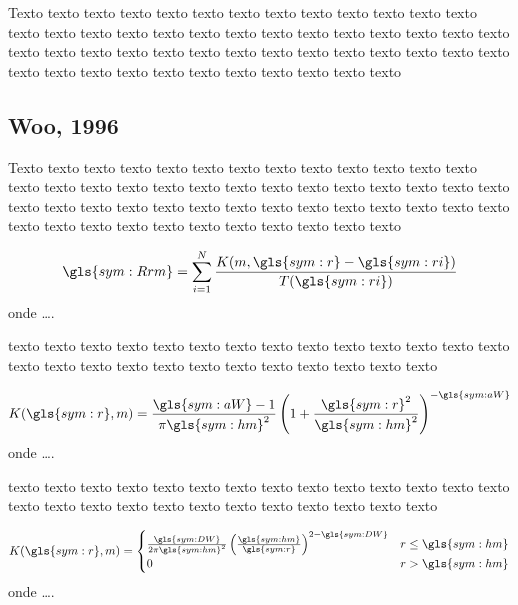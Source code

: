 Texto texto texto texto texto texto texto texto texto texto texto texto texto
texto texto texto texto texto texto texto texto texto texto texto texto texto
texto texto texto texto texto texto texto texto texto texto texto texto texto
texto texto texto texto texto texto texto texto texto texto texto texto texto



\subsection{Woo, 1996}
\label{sec:acidos_nucleicos}

Texto texto texto texto texto texto texto texto texto texto texto texto texto
texto texto texto texto texto texto texto texto texto texto texto texto texto
texto texto texto texto texto texto texto texto texto texto texto texto texto
texto texto texto texto texto texto texto texto texto texto texto texto texto




\begin{equation}
	\ensuremath{
		\gls{sym:Rrm} = \sum_{i=1}^{N} \frac{ K(m, \gls{sym:r} - \gls{sym:ri})}
											{T({\gls{sym:ri})}}
	}
	\label{eq:Rrm}
\end{equation}
onde \ldots.


texto texto texto texto texto texto texto texto texto texto texto texto texto
texto texto texto texto texto texto texto texto texto texto texto texto texto

\begin{equation}
	\ensuremath{
		K(\gls{sym:r}, m) =  \frac{  \gls{sym:aW}  -1}{\pi\gls{sym:hm}^2}
							\left( 1 + \frac{\gls{sym:r}^2}{\gls{sym:hm}^2} \right)^{-\gls{sym:aW}}
	}
	\label{eq:/krm1}
\end{equation}
onde \ldots.


texto texto texto texto texto texto texto texto texto texto texto texto texto
texto texto texto texto texto texto texto texto texto texto texto texto texto



\begin{equation}
	\ensuremath{
		K(\gls{sym:r}, m) = 
		\begin{cases}
			\frac{\gls{sym:DW}}{2\pi \gls{sym:hm}^2} 
			\left( \frac{\gls{sym:hm}}{\gls{sym:r}} \right)^{2 - \gls{sym:DW}} 
			  & r \leq \gls{sym:hm} \\
			0 & r > \gls{sym:hm}
		\end{cases}
	}
	\label{eq:krm2}
\end{equation}
onde \ldots.


